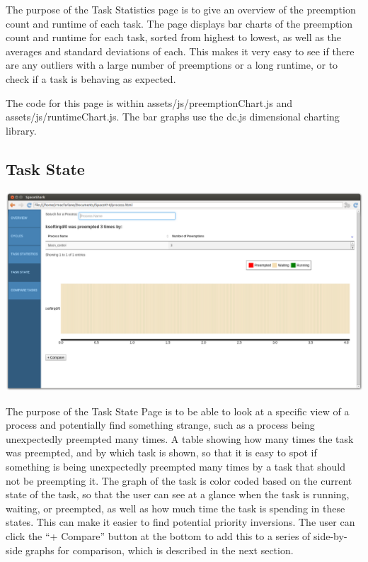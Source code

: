 \documentclass{hmcclinic}
\begin{document}
The purpose of the Task Statistics page is to give an overview of the preemption count and runtime of each task. The page displays bar charts of the preemption count and runtime for each task, sorted from highest to lowest, as well as the averages and standard deviations of each. This makes it very easy to see if there are any outliers with a large number of preemptions or a long runtime, or to check if a task is behaving as expected.

The code for this page is within assets/js/preemptionChart.js and assets/js/runtimeChart.js. The bar graphs use the dc.js dimensional charting library.

  \subsection{Task State}

  \includegraphics[scale=0.25]{task-state-page.png}
  
    The purpose of the Task State Page is to be able to look at a specific view of a
    process and potentially find something strange, such as a process being
    unexpectedly preempted many times. A table showing how many times the task was preempted, and by which task is shown, so that it is easy to spot if something is being unexpectedly preempted many times by a task that should not be preempting it. The graph of the task is color coded based on the current state of the task, so that the user can see at a glance when the task is running, waiting, or preempted, as well as how much time the task is spending in these states. This can make it easier to find potential priority inversions. The user can click the ``+ Compare'' button
    at the bottom to add this to a series of side-by-side graphs for comparison, which is described in the next section.
\end{document}
